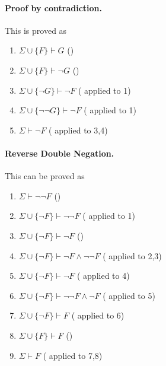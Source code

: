 \paragraph{Proof by contradiction.} %
\begin{prooftree}
\end{prooftree}
This is proved as
\begin{enumerate}
    \item $\Sigma\cup\{F\}\vdash G$ \hfill ()
    \item $\Sigma\cup\{F\}\vdash \neg G$ \hfill ()
    \item $\Sigma\cup\{\neg G\}\vdash \neg F$ \hfill ( applied to 1)
    \item $\Sigma\cup\{\neg \neg G\}\vdash \neg F$ \hfill ( applied to 1)
    \item $\Sigma\vdash \neg F$ \hfill ( applied to 3,4)
\end{enumerate}

\paragraph{Reverse Double Negation.} %
\begin{prooftree}
\end{prooftree}
This can be proved as
\begin{enumerate}
    \item $\Sigma\vdash \neg\neg F$ \hfill ()
    \item $\Sigma\cup\{\neg F\}\vdash \neg\neg F$ \hfill ( applied to 1)
    \item $\Sigma\cup\{\neg F\}\vdash \neg F$ \hfill ()
    \item $\Sigma\cup\{\neg F\}\vdash\neg F\land\neg\neg F$ \hfill ( applied to 2,3)
    \item $\Sigma\cup\{\neg F\}\vdash\neg F$ \hfill ( applied to 4)
    \item $\Sigma\cup\{\neg F\}\vdash\neg\neg F\land\neg F$ \hfill ( applied to 5)
    \item $\Sigma\cup\{\neg F\}\vdash F$ \hfill ( applied to 6)
    \item $\Sigma\cup\{F\}\vdash F$ \hfill ()
    \item $\Sigma\vdash F$ \hfill ( applied to 7,8)
\end{enumerate}


